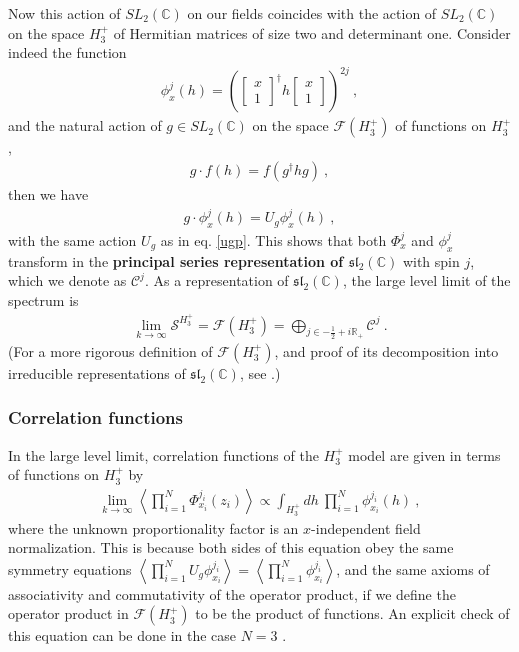 \documentclass[12pt, a4paper, notitlepage, twoside]{report}
\numberwithin{equation}{section}
\theoremstyle{break}
\begin{document}
Now this action of $SL_2({\mathbb{C}})$ on our fields coincides with the action of $SL_2({\mathbb{C}})$ on the space $H_3^+$ of Hermitian matrices of size two and determinant one.
Consider indeed the function
\begin{align}
 \phi^j_{x}(h) = \left(\begin{bmatrix}
                                x \\ 1
                               \end{bmatrix}^\dagger 
h \begin{bmatrix}
   x \\ 1 
  \end{bmatrix}
 \right)^{2j}\ ,
\end{align}
and the natural action of $g\in SL_2({\mathbb{C}})$ on the space $\mathcal{F}(H_3^+)$ of functions on $H_3^+$,
\begin{align}
 g\cdot f(h) = f(g^\dagger h g)\ ,
\end{align}
then we have 
\begin{align}
 g\cdot \phi^j_{x}(h) = U_g \phi^j_{x}(h)\ ,
\end{align}
with the same action $U_g$ as in eq. \eqref{ugp}.
This shows that both $\Phi^j_x$ and $\phi^j_x$ transform in the \textbf{\boldmath principal series representation of $\mathfrak{sl}_2({\mathbb{C}})$} with spin $j$, which we denote as $\mathcal{C}^j$. 
As a representation of $\mathfrak{sl}_2({\mathbb{C}})$, the large level limit of the spectrum is 
\begin{align}
 \underset{k\to\infty}{\lim} \mathcal{S}^{H_3^+} =  \mathcal{F}(H_3^+) = \bigoplus_{j\in -\frac12+i{\mathbb{R}}_+} \mathcal{C}^j\ .
\end{align}
(For a more rigorous definition of $\mathcal{F}(H_3^+)$, and proof of its decomposition into irreducible representations of $\mathfrak{sl}_2({\mathbb{C}})$, see \cite{tes97b}.)


\subsubsection{Correlation functions}

In the large level limit, correlation functions of the $H_3^+$ model are given in terms of functions on $H_3^+$ by 
\begin{align}
 \underset{k\to \infty}{\lim} \left\langle \prod_{i=1}^N \Phi^{j_i}_{x_i}(z_i)\right\rangle \propto \int_{H_3^+} dh\ \prod_{i=1}^N \phi^{j_i}_{x_i}(h)\ , 
\end{align}
where the unknown proportionality factor is an $x$-independent field normalization.
This is because both sides of this equation obey the same symmetry equations $\left<\prod_{i=1}^N U_g \phi^{j_i}_{x_i} \right> = \left<\prod_{i=1}^N \phi^{j_i}_{x_i} \right>$, and the same axioms of associativity and commutativity of the operator product, if we define the operator product in $\mathcal{F}(H_3^+)$ to be the product of functions. 
An explicit check of this equation can be done in the case $N=3$ \cite{tes97b}.
\end{document}
